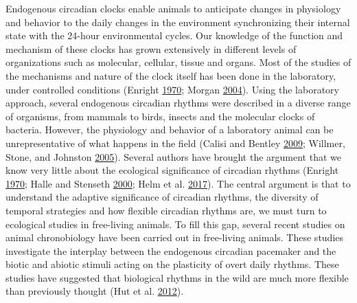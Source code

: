 \documentclass[msc,numbers,hidelinks]{coppe}
\begin{document}
  Endogenous circadian clocks enable animals to anticipate changes in physiology and behavior to the daily changes in the environment synchronizing their internal state with the 24-hour environmental cycles. Our knowledge of the function and mechanism of these clocks has grown extensively in different levels of organizations such as molecular, cellular, tissue and organs. Most of the studies of the mechanisms and nature of the clock itself has been done in the laboratory, under controlled conditions (Enright \protect\hyperlink{ref-enrightEcologicalAspectsEndogenous1970}{1970}; Morgan \protect\hyperlink{ref-morganEcologicalSignificanceBiological2004}{2004}). Using the laboratory approach, several endogenous circadian rhythms were described in a diverse range of organisms, from mammals to birds, insects and the molecular clocks of bacteria. However, the physiology and behavior of a laboratory animal can be unrepresentative of what happens in the field (Calisi and Bentley \protect\hyperlink{ref-calisiLabFieldExperiments2009}{2009}; Willmer, Stone, and Johnston \protect\hyperlink{ref-willmerEnvironmentalPhysiologyAnimals2005}{2005}). Several authors have brought the argument that we know very little about the ecological significance of circadian rhythms (Enright \protect\hyperlink{ref-enrightEcologicalAspectsEndogenous1970}{1970}; Halle and Stenseth \protect\hyperlink{ref-halleActivityPatternsSmall2000}{2000}; Helm et al. \protect\hyperlink{ref-helmTwoSidesCoin2017}{2017}). The central argument is that to understand the adaptive significance of circadian rhythms, the diversity of temporal strategies and how flexible circadian rhythms are, we must turn to ecological studies in free-living animals. To fill this gap, several recent studies on animal chronobiology have been carried out in free-living animals. These studies investigate the interplay between the endogenous circadian pacemaker and the biotic and abiotic stimuli acting on the plasticity of overt daily rhythms. These studies have suggested that biological rhythms in the wild are much more flexible than previously thought (Hut et al. \protect\hyperlink{ref-hutSearchTemporalNiche2012}{2012}).
\end{document}
